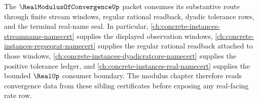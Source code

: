 The $\RealModulusOfConvergenceUp$ packet consumes its substantive route through finite stream windows, regular rational readback, dyadic tolerance rows, and the terminal real-name seal. In particular, \autoref{ch:concrete-instances-streamname-namecert} supplies the displayed observation windows, \autoref{ch:concrete-instances-regseqrat-namecert} supplies the regular rational readback attached to those windows, \autoref{ch:concrete-instances-dyadicratcore-namecert} supplies the positive tolerance ledger, and \autoref{ch:concrete-instances-real-namecert} supplies the bounded $\RealUp$ consumer boundary. The modulus chapter therefore reads convergence data from these sibling certificates before exposing any real-facing rate row.
